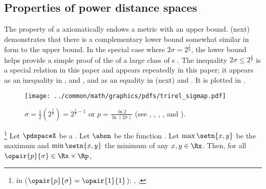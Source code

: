 \subsection{Properties of power distance spaces}
\label{sec:pdspace_propd}
The  property of a 
axiomatically endows a metric with an upper bound. 
 (next) demonstrates that there is a complementary lower bound 
somewhat similar in form to the  upper bound.
In the special case where $2\sigma=2^\frac{1}{p}$, 
the lower bound helps provide a simple proof of the  of 
a large class of s .
The inequality $2\sigma\le2^\frac{1}{p}$ is a special relation in this paper and appears repeatedly in this paper;
it appears as an inequality in ,  and ,
and as an equality in  (next) and .
It is plotted in .
\begin{figure}[t]
  \centering%
  \texttt{[image: ../common/math/graphics/pdfs/trirel\_sigmap.pdf]}
  \caption{$\sigma = \frac{1}{2}(2^{\frac{1}{p}}) = 2^{\frac{1}{p}-1}$ or $p=\frac{\ln2}{\ln(2\sigma)}$ 
    \label{fig:sigmap}
    \scs(see , , , , and ).
    }
\end{figure}
\begin{lemma}
\footnote{
  in  ($\opair{p}{\sigma}=\opair{1}{1}$):
  ,
  ,
  }
\label{lem:pdspace_ineq}
Let $\pdspaceX$ be a  . 
Let $\absn$ be the  function .
Let $\max\setn{x,y}$ be the maximum and $\min\setn{x,y}$ the minimum of any $x,y\in\Rx$.
Then, for all $\opair{p}{\sigma}\in\Rx\times\Rp$,
\end{lemma}
